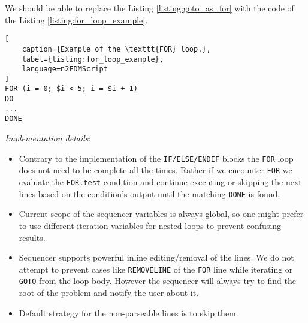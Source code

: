 We should be able to replace the Listing \ref{listing:goto_as_for} with the code of the Listing \ref{listing:for_loop_example}.
\begin{lstlisting}[
	caption={Example of the \texttt{FOR} loop.}, 
	label={listing:for_loop_example},
	language=n2EDMScript
]
FOR (i = 0; $i < 5; i = $i + 1)
DO
...
DONE
\end{lstlisting}

\textit{Implementation details}: 

\begin{itemize}
	\item Contrary to the implementation of the \texttt{IF/ELSE/ENDIF} blocks the \texttt{FOR} loop does not need to be complete all the times. Rather if we encounter \texttt{FOR} we evaluate the \texttt{FOR.test} condition and continue executing or skipping the next lines based on the condition's output until the matching \texttt{DONE} is found.
	\item Current scope of the sequencer variables is always global, so one might prefer to use different iteration variables for nested loops to prevent confusing results.
	\item Sequencer supports powerful inline editing/removal of the lines. We do not attempt to prevent cases like \texttt{REMOVELINE} of the \texttt{FOR} line while iterating or \texttt{GOTO} from the loop body. However the sequencer will always try to find the root of the problem and notify the user about it.
	\item Default strategy for the non-parseable lines is to skip them.
\end{itemize}
